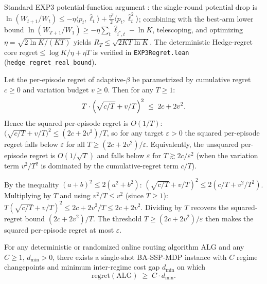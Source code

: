 \documentclass[opre,dblanonrev]{informs4}
\renewenvironment{proof}{\Trivlist\item[\hspace*{1em}\hskip\labelsep{\itshape Proof.\enskip}]\ignorespaces}{\endTrivlist\addvspace{0pt}}
\begin{document}
\begin{proof}[Proof sketch (full proof in EC.\ref{ec:detailed_proofs}).]
Standard EXP3 potential-function argument
\citep{auer2002nonstochastic}: the single-round potential drop is
$\ln(W_{t+1}/W_t)\leq -\eta\langle p_t,\hat\ell_t\rangle
+\tfrac{\eta^2}{2}\langle p_t,\hat\ell_t^2\rangle$; combining with
the best-arm lower bound $\ln(W_{T+1}/W_1)\geq -\eta\sum_t
\hat\ell_{i^*,t}-\ln K$, telescoping, and optimizing
$\eta=\sqrt{2\ln K/(KT)}$ yields $R_T\leq\sqrt{2KT\ln K}$. The
deterministic Hedge-regret core
$\mathrm{regret}\leq\log K/\eta+\eta T$ is verified in
\texttt{EXP3Regret.lean} (\texttt{hedge\_regret\_real\_bound}).
\end{proof}

\begin{theorem}\label{thm:converge}
Let the per-episode regret of adaptive-$\beta$ be parametrized by
cumulative regret $c \geq 0$ and variation budget $v \geq 0$.
Then for any $T \geq 1$:
\[
T\cdot\Bigl(\sqrt{c/T} + v/T\Bigr)^2 \;\leq\; 2c + 2v^2.
\]
Hence the squared per-episode regret is $O(1/T)$:
$\bigl(\sqrt{c/T} + v/T\bigr)^2 \leq (2c + 2v^2)/T$, so for any
target $\varepsilon > 0$ the squared per-episode regret falls below
$\varepsilon$ for all $T \geq (2c + 2v^2)/\varepsilon$. Equivalently,
the unsquared per-episode regret is $O(1/\sqrt{T})$ and falls below
$\varepsilon$ for $T \gtrsim 2c/\varepsilon^2$ (when the variation
term $v^2/T^2$ is dominated by the cumulative-regret term $c/T$).
\end{theorem}

\begin{proof}
By the inequality $(a+b)^2 \leq 2(a^2 + b^2)$:
$(\sqrt{c/T} + v/T)^2 \leq 2(c/T + v^2/T^2)$.
Multiplying by $T$ and using $v^2/T \leq v^2$ (since $T \geq 1$):
$T(\sqrt{c/T}+v/T)^2 \leq 2c + 2v^2/T \leq 2c + 2v^2$. Dividing
by $T$ recovers the squared-regret bound $(2c+2v^2)/T$. The
threshold $T \geq (2c+2v^2)/\varepsilon$ then makes the squared
per-episode regret at most $\varepsilon$.
\end{proof}

\begin{theorem}\label{thm:lower}
For any deterministic or randomized online routing algorithm
$\mathrm{ALG}$ and any $C\geq 1$, $d_{\min}>0$, there exists a
single-shot BA-SSP-MDP instance with $C$ regime changepoints and
minimum inter-regime cost gap $d_{\min}$ on which
\[
\mathrm{regret}(\mathrm{ALG}) \;\geq\; C \cdot d_{\min}.
\]
\end{theorem}
\end{document}
